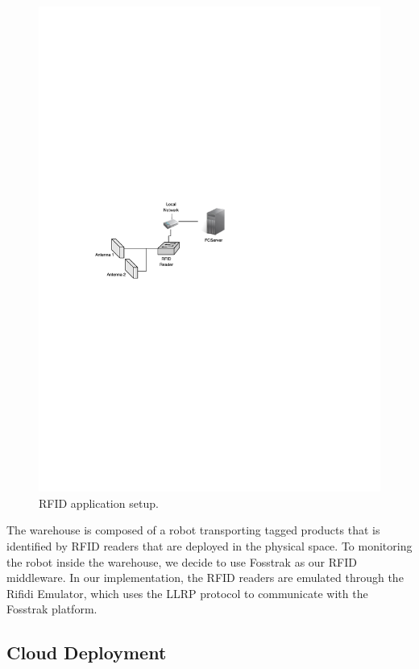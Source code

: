 \begin{figure}[ht!]
  \centering
  \includegraphics[width=.6\textwidth]{./images/rfidapp_setup}
  \caption[RFID application setup.]{RFID application setup.}
  \label{fig:rfidapp_setup}
\end{figure}

The warehouse is composed of a robot transporting tagged products that is identified by \gls{RFID} readers
that are deployed in the physical space. To monitoring the robot inside the warehouse, we decide to
use Fosstrak as our \gls{RFID} middleware. In our implementation, the \gls{RFID} readers are emulated
through the Rifidi Emulator, which uses the \gls{LLRP} protocol to communicate with the Fosstrak
platform.

\subsection{Cloud Deployment}
\label{sub:imp_smart_warehouse_cloud}

